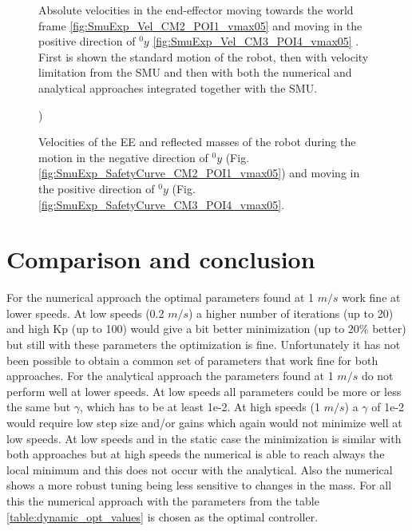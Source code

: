 \begin{figure}[htp!]
	\centering	
	 	 	
		\caption{Absolute velocities in the end-effector moving towards the world frame \ref{fig:SmuExp_Vel_CM2_POI1_vmax05} and moving in the positive direction of ${}^{0}_{}y$ \ref{fig:SmuExp_Vel_CM3_POI4_vmax05} . First is shown the standard motion of the robot, then with velocity limitation from the SMU and then with both the numerical and analytical approaches integrated together with the SMU.}
	\label{fig:SmuExp_Vel_vmax05}
\end{figure}




\begin{figure}[htp!]
	\centering	
	 	 	
	\caption{Velocities of the EE and reflected masses of the robot during the motion in the negative direction of ${}^{0}_{}y$   (Fig.\ref{fig:SmuExp_SafetyCurve_CM2_POI1_vmax05}) and moving in the positive direction of ${}^{0}_{}y$  (Fig.\ref{fig:SmuExp_SafetyCurve_CM3_POI4_vmax05}.})
	\label{fig:SmuExp_SafetyCurve_vmax05}
\end{figure}


\section{Comparison and conclusion}


For the numerical approach the optimal parameters found at 1 $m/s$ work fine at lower speeds. At low speeds (0.2 $m/s$) a higher number of iterations (up to 20) and high Kp (up to 100) would give a bit better minimization (up to 20\% better) but still with these parameters the optimization is fine.
%
Unfortunately it has not been possible to obtain a common set of parameters that work fine for both approaches. For the analytical approach the parameters found at 1 $m/s$ do not perform well at lower speeds. At low speeds all parameters could be more or less the same but $\gamma$, which has to be at least 1e-2. At high speeds (1 $m/s$) a $\gamma$ of 1e-2 would require low step size and/or gains which again would not minimize well at low speeds. 
%
At low speeds and in the static case the minimization is similar with both approaches but at high speeds the numerical is able to reach always the local minimum and this does not occur with the analytical. Also the numerical shows a more robust tuning being less sensitive to changes in the mass. For all this the numerical approach with the parameters from the table \ref{table:dynamic_opt_values} is chosen as the optimal controller.


